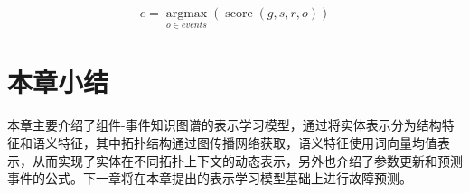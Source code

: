 \begin{equation}
    e = \mathop{\arg\max}\limits_{o\in events}( \operatorname{score} (g, s, r, o)) 
    \label{predict-next-event}   
\end{equation}


\section{本章小结}
本章主要介绍了组件-事件知识图谱的表示学习模型，通过将实体表示分为结构特征和语义特征，其中拓扑结构通过图传播网络获取，语义特征使用词向量均值表示，从而实现了实体在不同拓扑上下文的动态表示，另外也介绍了参数更新和预测事件的公式。下一章将在本章提出的表示学习模型基础上进行故障预测。





